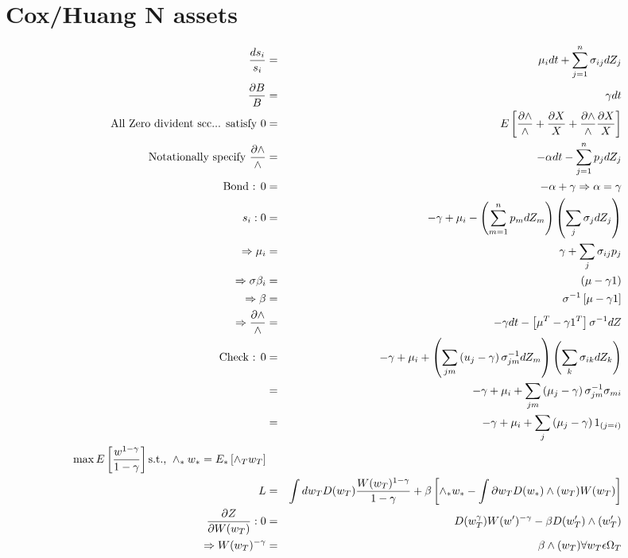 \documentclass[]{article}
\begin{document}
\section*{Cox/Huang N assets}
\begin{eqnarray*}
\frac{ds_i}{s_i} &=& \mu _i dt + \sum_{j=1}^n \sigma _{ij} dZ_j\\
\frac{\partial B}{B} &=& \gamma dt\\
\mbox{All Zero divident scc... satisfy } 0 &=& E \left[ \frac{\partial \wedge}{\wedge} + \frac{\partial X}{X} + \frac{\partial \wedge}{\wedge} \frac{\partial X}{X}  \right]\\
\mbox{Notationally specify } \frac{\partial \wedge}{\wedge} &=& -\alpha dt - \sum_{j=1}^n p_j dZ_j\\
\mbox{Bond : } 0 &=& -\alpha + \gamma \Rightarrow \alpha = \gamma \\
s_i : 0 &=& -\gamma +\mu _i - \left( \sum_{m=1}^n p_m dZ_m\right) \left( \sum_{j} \sigma _j dZ_j\right) \\
\Rightarrow \mu _i &=& \gamma + \sum_{j} \sigma _{ij} p_j\\
\Rightarrow \sigma \beta _i &=& \left( \mu - \gamma 1 \right)\\
\Rightarrow \beta &=& \sigma^{-1} \left[ \mu - \gamma 1 \right]\\
\Rightarrow \frac{\partial \wedge}{\wedge} &=& -\gamma dt - \left[ \mu ^T - \gamma 1^T\right] \sigma ^{-1} dZ\\
\mbox{Check : } 0 &=& -\gamma + \mu _{i} + \left( \sum_{jm} \left( u_j - \gamma \right)\sigma _{jm} ^{-1} dZ_m \right) \left( \sum_{k} \sigma _{ik} dZ_k\right)\\
&=& -\gamma + \mu _{i} + \sum_{jm} \left( \mu _j - \gamma \right) \sigma _{jm} ^{-1} \sigma _{mi}\\
&=& -\gamma + \mu _{i} + \sum_{j} \left( \mu _j - \gamma \right) 1_{\left( j=i \right)}\\
\max E\left[ \frac{w^{1-\gamma}}{1-\gamma} \right] \mbox{s.t., } \wedge _* w_* = E_*\left[ \wedge _T w_T \right]\\
L &=& \int dw_T D(w_T) \frac{W(w_T)^{1-\gamma}}{1-\gamma} + \beta \left[ \wedge _* w_* - \int \partial w_T D(w_*) \wedge (w_T) W(w_T) \right]\\
\frac{\partial Z}{\partial W(w_T)} : 0 &=& D(w_T^\gamma) W(w^\prime)^{-\gamma} - \beta D(w_T^\prime) \wedge (w_T^\prime)\\
\Rightarrow W(w_T)^{-\gamma} &=& \beta \wedge(w_T) \forall w_T \epsilon \ohm _T \\

\end{eqnarray*}
\end{document}
